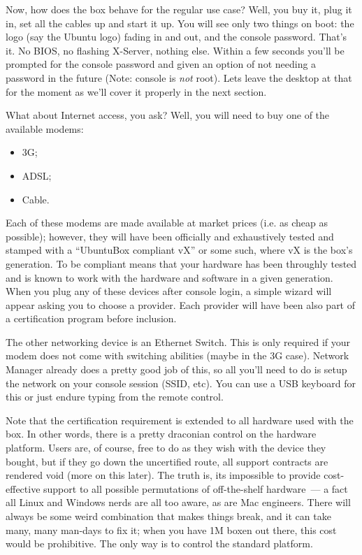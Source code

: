 \documentclass{book}
\begin{document}
Now, how does the box behave for the regular use case? Well, you buy
it, plug it in, set all the cables up and start it up. You will see
only two things on boot: the logo (say the Ubuntu logo) fading in and
out, and the console password. That's it. No BIOS, no flashing
X-Server, nothing else. Within a few seconds you'll be prompted for
the console password and given an option of not needing a password in
the future (Note: console is \emph{not} root). Lets leave the desktop at
that for the moment as we'll cover it properly in the next section.

What about Internet access, you ask? Well, you will need to buy one of
the available modems:

\begin{itemize}
\item 3G;
\item ADSL;
\item Cable.
\end{itemize}

Each of these modems are made available at market prices (i.e. as
cheap as possible); however, they will have been officially and
exhaustively tested and stamped with a ``UbuntuBox compliant vX'' or
some such, where vX is the box's generation. To be compliant means
that your hardware has been throughly tested and is known to work with
the hardware and software in a given generation. When you plug any of
these devices after console login, a simple wizard will appear asking
you to choose a provider. Each provider will have been also part of a
certification program before inclusion.

The other networking device is an Ethernet Switch. This is only
required if your modem does not come with switching abilities (maybe
in the 3G case). Network Manager already does a pretty good job of
this, so all you'll need to do is setup the network on your console
session (SSID, etc). You can use a USB keyboard for this or just
endure typing from the remote control.

Note that the certification requirement is extended to all hardware
used with the box. In other words, there is a pretty draconian control
on the hardware platform. Users are, of course, free to do as they
wish with the device they bought, but if they go down the uncertified
route, all support contracts are rendered void (more on this
later). The truth is, its impossible to provide cost-effective support
to all possible permutations of off-the-shelf hardware~--- a fact all
Linux and Windows nerds are all too aware, as are Mac engineers. There
will always be some weird combination that makes things break, and it
can take many, many man-days to fix it; when you have 1M boxen out
there, this cost would be prohibitive. The only way is to control the
standard platform.
\end{document}
